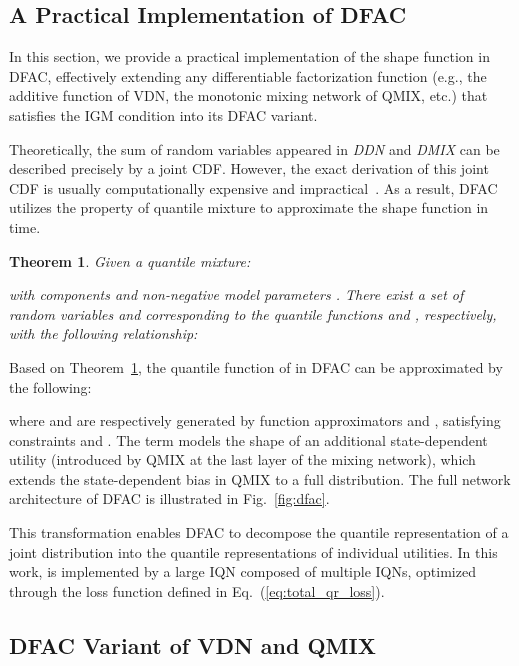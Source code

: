 \documentclass{article}
\newcommand{\ddn}{\textit{DDN}}
\newcommand{\dmix}{\textit{DMIX}}
\newtheorem{theorem}{Theorem}[section]
\begin{document}
\subsection{A Practical Implementation of DFAC}
\label{subsec:methodology_a_practical_implementation_of_dfac}

In this section, we provide a practical implementation of the shape function  in DFAC, effectively extending any differentiable factorization function  (e.g., the additive function of VDN, the monotonic mixing network of QMIX, etc.) that satisfies the IGM condition into its DFAC variant.

Theoretically, the sum of random variables appeared in \ddn{} and \dmix{} can be described precisely by a joint CDF. However, the exact derivation of this joint CDF is usually computationally expensive and impractical~\cite{Lin2019DR-DRL}. As a result, DFAC utilizes the property of quantile mixture to approximate the shape function  in  time.

\begin{theorem}
\label{thm:sum_of_rv}
Given a quantile mixture:

with  components  and non-negative model parameters . There exist a set of random variables  and   corresponding to the quantile functions  and , respectively, with the following relationship:

\end{theorem} 
Based on Theorem~\ref{thm:sum_of_rv}, the quantile function  of  in DFAC can be approximated by the following:

where  and  are respectively generated by function approximators  and , satisfying constraints  and . The term  models the shape of an additional state-dependent utility (introduced by QMIX at the last layer of the mixing network), which extends the state-dependent bias in QMIX to a full distribution. The full network architecture of DFAC is illustrated in Fig.~\ref{fig:dfac}.

This transformation enables DFAC to decompose the quantile representation of a joint distribution into the quantile representations of individual utilities. In this work,  is implemented by a large IQN composed of multiple IQNs, optimized through the loss function defined in Eq.~(\ref{eq:total_qr_loss}).

\subsection{DFAC Variant of VDN and QMIX}
\label{subsec:methodology_distributional_variant_of_vdn_and_qmix}
\end{document}
